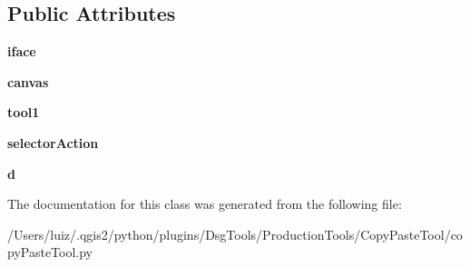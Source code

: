 \subsection*{Public Attributes}
\begin{DoxyCompactItemize}
\item 
\mbox{\label{class_dsg_tools_1_1_production_tools_1_1_copy_paste_tool_1_1copy_paste_tool_1_1_copy_paste_tool_a03af3c79dfe7f84196df09aa637c2cd9}} 
{\bfseries iface}
\item 
\mbox{\label{class_dsg_tools_1_1_production_tools_1_1_copy_paste_tool_1_1copy_paste_tool_1_1_copy_paste_tool_a84149ed6fefd3242b5def089bc5d6208}} 
{\bfseries canvas}
\item 
\mbox{\label{class_dsg_tools_1_1_production_tools_1_1_copy_paste_tool_1_1copy_paste_tool_1_1_copy_paste_tool_a340161ef2e7e9a8ea0324ca2d3e20f89}} 
{\bfseries tool1}
\item 
\mbox{\label{class_dsg_tools_1_1_production_tools_1_1_copy_paste_tool_1_1copy_paste_tool_1_1_copy_paste_tool_a778e27299c6a2212542f46962e9544cc}} 
{\bfseries selector\+Action}
\item 
\mbox{\label{class_dsg_tools_1_1_production_tools_1_1_copy_paste_tool_1_1copy_paste_tool_1_1_copy_paste_tool_ad4b2c3198f369c199cd8ed22098f41d3}} 
{\bfseries d}
\end{DoxyCompactItemize}


The documentation for this class was generated from the following file\+:\begin{DoxyCompactItemize}
\item 
/\+Users/luiz/.\+qgis2/python/plugins/\+Dsg\+Tools/\+Production\+Tools/\+Copy\+Paste\+Tool/copy\+Paste\+Tool.\+py\end{DoxyCompactItemize}
